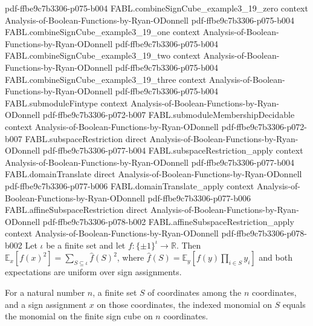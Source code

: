 \begin{theorem}
  {pdf-ffbe9c7b3306-p075-b004}
\proofstep
  {FABL.combineSignCube_example3_19_zero}
  {context}
  {Analysis-of-Boolean-Functions-by-Ryan-ODonnell}
  {pdf-ffbe9c7b3306-p075-b004}
\proofstep
  {FABL.combineSignCube_example3_19_one}
  {context}
  {Analysis-of-Boolean-Functions-by-Ryan-ODonnell}
  {pdf-ffbe9c7b3306-p075-b004}
\proofstep
  {FABL.combineSignCube_example3_19_two}
  {context}
  {Analysis-of-Boolean-Functions-by-Ryan-ODonnell}
  {pdf-ffbe9c7b3306-p075-b004}
\proofstep
  {FABL.combineSignCube_example3_19_three}
  {context}
  {Analysis-of-Boolean-Functions-by-Ryan-ODonnell}
  {pdf-ffbe9c7b3306-p075-b004}
\proofstep
  {FABL.submoduleFintype}
  {context}
  {Analysis-of-Boolean-Functions-by-Ryan-ODonnell}
  {pdf-ffbe9c7b3306-p072-b007}
\proofstep
  {FABL.submoduleMembershipDecidable}
  {context}
  {Analysis-of-Boolean-Functions-by-Ryan-ODonnell}
  {pdf-ffbe9c7b3306-p072-b007}
\proofstep
  {FABL.subspaceRestriction}
  {direct}
  {Analysis-of-Boolean-Functions-by-Ryan-ODonnell}
  {pdf-ffbe9c7b3306-p077-b004}
\proofstep
  {FABL.subspaceRestriction_apply}
  {context}
  {Analysis-of-Boolean-Functions-by-Ryan-ODonnell}
  {pdf-ffbe9c7b3306-p077-b004}
\proofstep
  {FABL.domainTranslate}
  {direct}
  {Analysis-of-Boolean-Functions-by-Ryan-ODonnell}
  {pdf-ffbe9c7b3306-p077-b006}
\proofstep
  {FABL.domainTranslate_apply}
  {context}
  {Analysis-of-Boolean-Functions-by-Ryan-ODonnell}
  {pdf-ffbe9c7b3306-p077-b006}
\proofstep
  {FABL.affineSubspaceRestriction}
  {direct}
  {Analysis-of-Boolean-Functions-by-Ryan-ODonnell}
  {pdf-ffbe9c7b3306-p078-b002}
\proofstep
  {FABL.affineSubspaceRestriction_apply}
  {context}
  {Analysis-of-Boolean-Functions-by-Ryan-ODonnell}
  {pdf-ffbe9c7b3306-p078-b002}
Let $\iota$ be a finite set and let $f:\{\pm1\}^{\iota}\to\mathbb R$. Then $\mathbb
E_x[f(x)^2]=\sum_{S\subseteq\iota}\widehat f(S)^2$, where $\widehat f(S)=\mathbb
E_y[f(y)\prod_{i\in S}y_i]$ and both expectations are uniform over sign assignments.
\end{theorem}

\begin{theorem}
\label{FABL.indexedMonomial_fin_eq_monomial}
\leanok
{}
For a natural number $n$, a finite set $S$ of coordinates among the $n$ coordinates, and
a sign assignment $x$ on those coordinates, the indexed monomial on $S$ equals the
monomial on the finite sign cube on $n$ coordinates.
\end{theorem}

